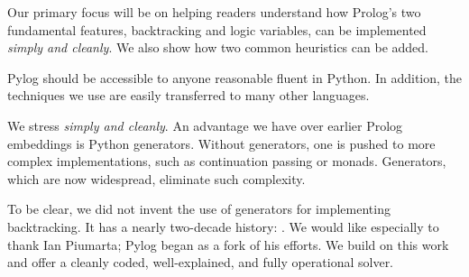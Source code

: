Our primary focus will be on helping readers understand how Prolog's two fundamental features, backtracking and logic variables, can be implemented \textit{simply and cleanly}. We also show how two common heuristics can be added. 

Pylog should be accessible to anyone reasonable fluent in Python. In addition, the techniques we use are easily transferred to many other languages. 


We stress \textit{simply and cleanly}. An advantage we have over earlier Prolog embeddings is Python generators. Without generators, one is pushed to more complex implementations, such as continuation passing\cite{amin2019lightweight} or monads\cite{seres1999embedding}. Generators, which are now widespread\cite{wikipedia-generators}, eliminate such complexity. 

To be clear, we did not invent the use of generators for implementing backtracking. It has a nearly two-decade history: \cite{berger2004, Bolz2007, Delford2009, Frederiksen2011, Meyers2015, Thompson2017, Santini2018, Cesar2019, Miljkovic2019}. We would like especially to thank Ian Piumarta\cite{Piumarta2017}; Pylog began as a fork of his efforts. We build on this work and offer a cleanly coded, well-explained, and fully operational solver.



